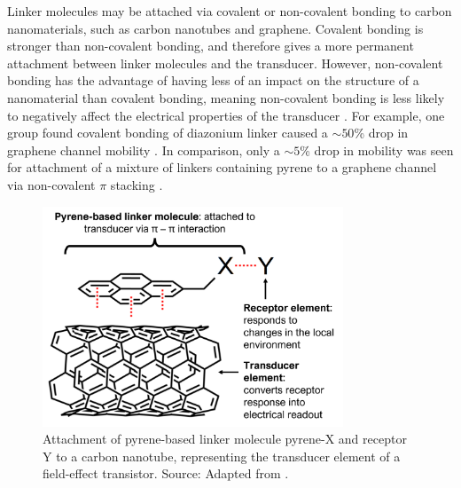 \documentclass[
  a4paper,
]{scrbook}
\begin{document}
Linker molecules may be attached via covalent or non-covalent bonding to
carbon nanomaterials, such as carbon nanotubes and graphene. Covalent
bonding is stronger than non-covalent bonding, and therefore gives a
more permanent attachment between linker molecules and the transducer.
However, non-covalent bonding has the advantage of having less of an
impact on the structure of a nanomaterial than covalent bonding, meaning
non-covalent bonding is less likely to negatively affect the electrical
properties of the transducer
\autocite{Long2012,DiCrescenzo2014,Wang2020,Mishyn2022}. For example,
one group found covalent bonding of diazonium linker caused a
\(\sim 50\)\% drop in graphene channel mobility \autocite{Lerner2014}.
In comparison, only a \(\sim 5\)\% drop in mobility was seen for
attachment of a mixture of linkers containing pyrene to a graphene
channel via non-covalent \(\pi\) stacking \autocite{Thodkar2021}.

\begin{figure}

{\centering \includegraphics[width=0.8\textwidth,height=\textheight]{figures/ch6/pyrene-cnt.png}

}

\caption{\label{fig-pi-interaction-cnt}Attachment of pyrene-based linker
molecule pyrene-X and receptor Y to a carbon nanotube, representing the
transducer element of a field-effect transistor. Source: Adapted from
\autocite{Carbonnanotube}.}

\end{figure}
\end{document}
